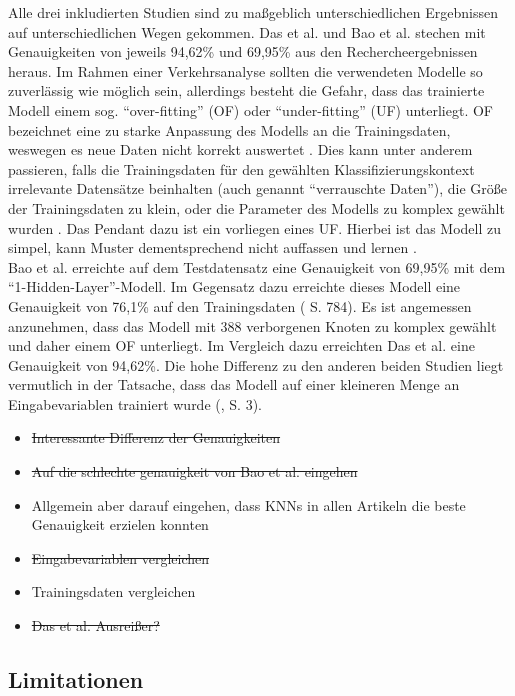 \documentclass{scrartcl}
\begin{document}
Alle drei inkludierten Studien sind zu maßgeblich unterschiedlichen Ergebnissen
auf unterschiedlichen Wegen gekommen. Das et al. und Bao et al. stechen
mit Genauigkeiten von jeweils 94,62\% und 69,95\% aus den Rechercheergebnissen
heraus. Im Rahmen einer Verkehrsanalyse sollten die verwendeten Modelle so
zuverlässig wie möglich sein, allerdings besteht die Gefahr, dass das trainierte
Modell einem sog. \enquote{over-fitting} (OF) oder \enquote{under-fitting} (UF)
unterliegt. OF bezeichnet eine zu starke Anpassung des Modells an die Trainingsdaten,
weswegen es neue Daten nicht korrekt auswertet \cite{aws}.
Dies kann unter anderem passieren, falls die Trainingsdaten für den gewählten 
Klassifizierungskontext irrelevante Datensätze beinhalten 
(auch genannt \enquote{verrauschte Daten}), die Größe der Trainingsdaten 
zu klein, oder die Parameter des Modells zu komplex
gewählt wurden \cite{aws}. Das Pendant dazu ist ein vorliegen eines UF.
Hierbei ist das Modell zu simpel, kann Muster dementsprechend nicht auffassen
und lernen \cite{ibm2}.
\medskip \\
Bao et al. erreichte auf dem Testdatensatz eine Genauigkeit von 69,95\% mit
dem \enquote{1-Hidden-Layer}-Modell. Im Gegensatz dazu erreichte dieses Modell
eine Genauigkeit von 76,1\% auf den Trainingsdaten (\cite{bao} S. 784).
Es ist angemessen anzunehmen, dass das Modell mit 388 verborgenen Knoten zu
komplex gewählt und daher einem OF unterliegt.
Im Vergleich dazu erreichten Das et al. eine Genauigkeit von 94,62\%.
Die hohe Differenz zu den anderen beiden Studien liegt vermutlich in der Tatsache,
dass das Modell auf einer kleineren Menge an Eingabevariablen trainiert wurde 
(\cite{das}, S. 3).

\begin{itemize}
   \item{\sout{Interessante Differenz der Genauigkeiten}}
   \item{\sout{Auf die schlechte genauigkeit von Bao et al. eingehen}}
   \item{Allgemein aber darauf eingehen, dass KNNs in allen Artikeln die beste Genauigkeit erzielen konnten}
   \item{\sout{Eingabevariablen vergleichen}}
   \item{Trainingsdaten vergleichen}
   \item{\sout{Das et al. Ausreißer?}}
\end{itemize}

\subsection{Limitationen}
\end{document}
